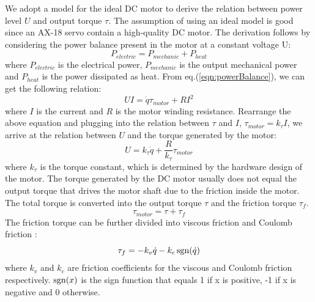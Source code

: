 We adopt a model for the ideal DC motor \cite{} to derive the relation between power level $U$ and output torque $\tau$. The assumption of using an ideal model is good since an AX-18 servo contain a high-quality DC motor. The derivation follows by considering the power balance present in the motor at a constant voltage U:
\begin{equation}
  P_{electric} = P_{mechanic} + P_{heat}
  \label{eqn:powerBalance}
\end{equation}
where $P_{electric}$ is the electrical power, $P_{mechanic}$ is the output mechanical power and $P_{heat}$ is the power dissipated as heat. From eq.(\ref{eqn:powerBalance}), we can get the following relation:
\begin{equation}
UI=\dot{q}\tau_{motor} + RI^2
\end{equation}
where $I$ is the current and $R$ is the motor winding resistance. Rearrange the above equation and plugging into the relation between $\tau$ and $I$, $\tau_{motor}=k_{\tau}I$, we arrive at the relation between $U$ and the torque generated by the motor:
\begin{equation}
  U=k_{\tau}\dot{q}+\frac{R}{k_{\tau}}\tau_{motor}
  \label{eqn:votageTorqueRelation}
\end{equation}
where $k_{\tau}$ is the torque constant, which is determined by the hardware design of the motor. The torque generated by the DC motor usually does not equal the output torque that drives the motor shaft due to the friction inside the motor. The total torque is converted into the output torque $\tau$ and the friction torque $\tau_f$.
\begin{equation}
  \tau_{motor}=\tau+\tau_f
  \label{eqn:torqueBalance}
\end{equation}
The friction torque can be further divided into viscous friction and Coulomb friction \cite{}:
\begin{equation}
  \tau_f = -k_v\dot{q}-k_c\operatorname{sgn}(\dot{q})
  \label{eqn:frictionComponents}
\end{equation}
where $k_v$ and $k_c$ are friction coefficients for the viscous and Coulomb friction respectively. $\operatorname{sgn}(x)$ is the sign function that equals 1 if x is positive, -1 if x is negative and 0 otherwise.

